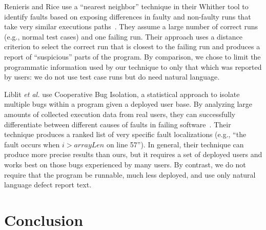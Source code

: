 \documentclass[conference]{IEEEtran}
\begin{document}
Renieris and Rice use a ``nearest neighbor'' technique in their
Whither tool to identify faults based on exposing differences in
faulty and non-faulty runs that take very similar executions
paths~\cite{Renieris03}. They assume a large number of correct runs
(e.g., normal test cases) and one failing run. Their approach uses a
distance criterion to select the correct run that is closest to the
failing run and produces a report of ``suspicious'' parts of the
program. By comparison, we chose to limit the programmatic information
used by our technique to only that which was reported by users: we
do not use test case runs but do need natural language.

Liblit \textit{et al.} use Cooperative Bug Isolation, a statistical
approach to isolate multiple bugs within a program given a deployed user
base. By analyzing large amounts of collected execution data from real
users, they can successfully differentiate between different causes of
faults in failing software~\cite{liblit05}. Their technique produces
a ranked list of very specific fault localizations (e.g., ``the fault
occurs when $i > arrayLen$ on line 57''). In general, their technique
can produce more precise results than ours, but it requires a set of
deployed users and works best on those bugs experienced by many users.
By contrast, we do not require that the program be runnable, much less
deployed, and use only natural language defect report text.

\section{Conclusion}



\end{document}
